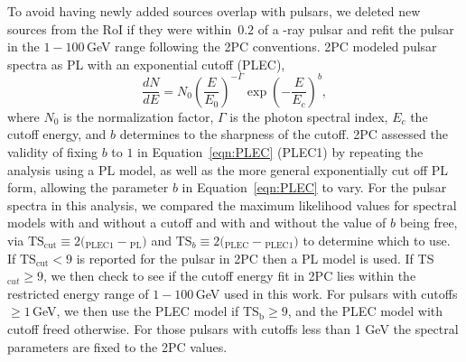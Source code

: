 {To avoid having newly added sources overlap with pulsars, we deleted new sources from the RoI if they were within~$0.2$\degr{} of a \g-ray pulsar and refit the pulsar in the $1-100$\,GeV range following the 2PC conventions. 
2PC modeled pulsar spectra as PL with an exponential cutoff (PLEC),
\begin{equation}
	\newcommand{\pfrac}[2]{\left(\frac{#1}{#2}\right)} \frac{dN}{dE} = N_0 \pfrac{E}{E_0}^{-\Gamma} \exp\left(-\frac{E}{E_c}\right)^{b},
	\label{eqn:PLEC}
\end{equation}
where \textit{$N_0$} is the normalization factor, \textit{$\Gamma$} is the photon spectral index, \textit{$E_c$} the cutoff energy, and $b$ determines to the sharpness of the cutoff. 2PC assessed the validity of fixing $b$ to $1$ in Equation~\ref{eqn:PLEC} (PLEC1) 
by repeating the analysis using a PL model, as well as the more general exponentially cut off PL form, allowing the parameter $b$ in Equation~\ref{eqn:PLEC} to vary. For the pulsar spectra in this analysis, we compared the maximum likelihood values for spectral models with and without a cutoff and with and without the value of $b$ being free, via %
$\mathrm{TS_{cut}} \equiv 2 ($\logL{}$_{\mathrm{PLEC1}}-$\logL{}$_{\mathrm{PL}})$ and $\mathrm{TS}_{b} \equiv 2 ($\logL{}$_{\mathrm{PLEC}}-$\logL{}$_{\mathrm{PLEC1}})$ to determine which to use. If $\mathrm{TS_{cut}} < 9$ is reported for the pulsar in 2PC then a PL model is used. If TS$_{\mathrm cut} \geq 9$, we then check to see if the cutoff energy fit in 2PC lies within the restricted energy range of $1-100$\,GeV used in this work. For pulsars with cutoffs $\geq 1$\,GeV, we then use the PLEC model if TS$_{\mathrm b} \geq 9$, and the PLEC model with cutoff freed otherwise. %
For those pulsars with cutoffs less than 1 GeV the spectral parameters are fixed to the 2PC values.


}
